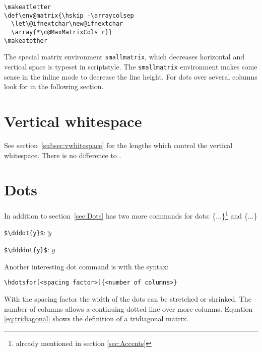 \begin{table}[htb]
\begin{lstlisting}
\makeatletter
\def\env@matrix{\hskip -\arraycolsep
  \let\@ifnextchar\new@ifnextchar
  \array{*\c@MaxMatrixCols r}}
\makeatother
\end{lstlisting}

The special matrix environment \verb+smallmatrix+, which decreases
horizontal and vertical space is typeset in scriptstyle. The \verb|smallmatrix|
 environment makes some sense
in the inline mode to decrease the line height.
For dots over several columns look for  in the following section.



\section{Vertical whitespace}\label{sec:ams-whitespace}
See section~\vref{subsec:vwhitespace} for the lengths which control the
vertical whitespace. There is no difference to \AmSmath.

\section{Dots}\label{sec:ams-dots}

In addition to section~\vref{sec:Dots} \AmSmath has two more commands
for dots: \{...\}\footnote{already mentioned in section \ref{sec:Accents}} and \{...\}

\verb|$\dddot{y}$|: $\dddot{y}$

\verb|$\ddddot{y}$|: $\ddddot{y}$


Another interesting dot command is 
with the syntax:

\begin{lstlisting}
\hdotsfor[<spacing factor>]{<number of columns>}
\end{lstlisting}

With the spacing factor the width of the dots can be stretched or
shrinked. The number of columns allows a continuing dotted line over
more columns. Equation \ref{eq:tridiagonal} shows the definition
of a tridiagonal matrix.


\end{table}

